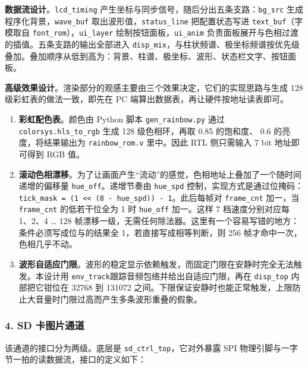 \documentclass[withoutpreface,bwprint]{cumcmthesis}
\begin{document}
\textbf{数据流设计}。\texttt{lcd\_timing} 产生坐标与同步信号，随后分出五条支路：\texttt{bg\_src} 生成程序化背景，\texttt{wave\_buf} 取出波形值，\texttt{status\_line} 把配置状态写进 \texttt{text\_buf}（字模取自 \texttt{font\_rom}），\texttt{ui\_layer} 绘制按钮面板，\texttt{ui\_anim} 负责面板展开与色相过渡的插值。五条支路的输出全部进入 \texttt{disp\_mix}，与柱状频谱、极坐标频谱按优先级叠加。叠加顺序从低到高为：背景、柱谱、极坐标、波形、状态栏文字、按钮面板。

\textbf{高级效果设计}。渲染部分的观感主要由三个效果决定，它们的实现思路与生成 128 级彩虹表的做法一致，即先在 PC 端算出数据表，再让硬件按地址读表即可。

\begin{enumerate}
\item \textbf{彩虹配色表}。颜色由 Python 脚本 \texttt{gen\_rainbow.py} 通过 \texttt{colorsys.hls\_to\_rgb} 生成 128 级色相环，再取 0.85 的饱和度、 0.6 的亮度，将结果输出为 \texttt{rainbow\_rom.v} 里中。因此 RTL 侧只需输入 7 bit 地址即可得到 RGB 值。

\item \textbf{滚动色相漂移}。为了让画面产生“流动”的感觉，色相地址上叠加了一个随时间递增的偏移量 \texttt{hue\_off}。递增节奏由 \texttt{hue\_spd} 控制，实现方式是通过位掩码：\texttt{tick\_mask = (1 << (8 - hue\_spd)) - 1}。此后每帧对 \texttt{frame\_cnt} 加一，当 \texttt{frame\_cnt} 的低若干位全为 1 时 \texttt{hue\_off} 加一。这样 7 档速度分别对应每 1、2、4 … 128 帧漂移一级，无需任何除法器。这里有一个容易写错的地方：条件必须写成位与的结果全 1，若直接写成相等判断，则 256 帧才命中一次，色相几乎不动。

\item \textbf{波形自适应门限}。波形的稳定显示依赖触发，而固定门限在安静时完全无法触发。本设计用 \texttt{env\_track}跟踪音频包络并给出自适应门限，再在 \texttt{disp\_top} 内部把它钳位在 32768 到 131072 之间。下限保证安静时也能正常触发，上限防止大音量时门限过高而产生多条波形重叠的假象。
\end{enumerate}

\subsubsection*{4. SD 卡图片通道}

该通道的接口分为两级。底层是 \texttt{sd\_ctrl\_top}，它对外暴露 SPI 物理引脚与一字节一拍的读数据流，接口的定义如下：
\end{document}
